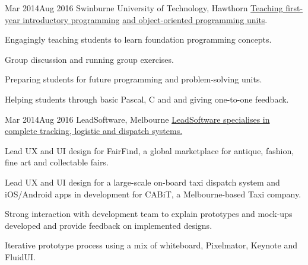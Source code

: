 {Mar 2014}{Aug 2016}
{Swinburne University of Technology, Hawthorn}
{\href{http://www.swinburne.edu.au/study/courses/units/Introduction-to-Programming-COS10009/local}{Teaching first-year introductory programming} \href{http://www.swinburne.edu.au/study/courses/units/Object-Oriented-Programming-COS70006/local}{and object-oriented programming units}.}
{
  \item Engagingly teaching students to learn foundation programming concepts.
  \item Group discussion and running group exercises.
  \item Preparing students for future programming and problem-solving units.
  \item Helping students through basic Pascal, C and \Csh\hspace{0.25ex}and giving one-to-one feedback.
}

{Mar 2014}{Aug 2016}
{LeadSoftware, Melbourne}
{\href{http://www.leadsoftware.com.au/}{LeadSoftware specialises in complete tracking, logistic and dispatch systems.}}
{
  \item Lead UX and UI design for FairFind, a global marketplace for antique, fashion, fine art and collectable fairs.
  \item Lead UX and UI design for a large-scale on-board taxi dispatch system and iOS/Android apps in development for CABiT, a Melbourne-based Taxi company.
  \item Strong interaction with development team to explain prototypes and mock-ups developed and provide feedback on implemented designs.
  \item Iterative prototype process using a mix of whiteboard, Pixelmator, Keynote and FluidUI.
}